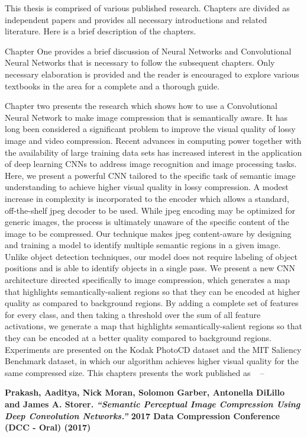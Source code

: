 This thesis is comprised of various published research. Chapters are divided as independent papers and provides all necessary introductions and related literature. Here is a brief description of the chapters.

Chapter One provides a brief discussion of Neural Networks and Convolutional Neural Networks that is necessary to follow the subsequent chapters. Only necessary elaboration is provided and the reader is encouraged to explore various textbooks in the area for a complete and a thorough guide.

Chapter two presents the research which shows how to use a Convolutional Neural Network to make image compression that is semantically aware.
It has long been considered a significant problem to improve the visual quality of lossy image and video compression. Recent advances in computing power together with the availability of large training data sets has increased interest in the application of deep learning CNNs to address image recognition and image processing tasks. Here, we present a powerful CNN tailored to the specific task of semantic image understanding to achieve higher visual quality in lossy compression. A modest increase in complexity is incorporated to the encoder which allows a standard, off-the-shelf jpeg decoder to be used. While jpeg encoding may be optimized for generic images, the process is ultimately unaware of the specific content of the image to be compressed. Our technique makes jpeg content-aware by designing and training a model to identify multiple semantic regions in a given image. Unlike object detection techniques, our model does not require labeling of object positions and is able to identify objects in a single pass. We present a new CNN architecture directed specifically to image compression, which generates a map that highlights semantically-salient regions so that they can be encoded at higher quality as compared to background regions. By adding a complete set of features for every class, and then taking a threshold over the sum of all feature activations, we generate a map that highlights semantically-salient regions so that they can be encoded at a better quality compared to background regions. Experiments are presented on the Kodak PhotoCD dataset and the MIT Saliency Benchmark dataset, in which our algorithm achieves higher visual quality for the same compressed size.
This chapters presents the work published as ~\cite{Prakash2017SemanticPI} --

\noindent\textbf{
Prakash, Aaditya, Nick Moran, Solomon Garber, Antonella DiLillo and James A. Storer. \textit{``Semantic Perceptual Image Compression Using Deep Convolution Networks.''} 2017 Data Compression Conference (DCC - Oral) (2017)
}
\vspace{2em}


